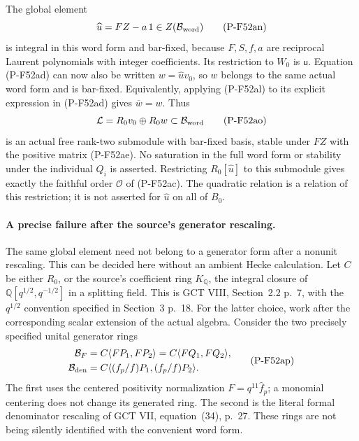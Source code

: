 \documentclass[11pt,a4paper]{article}
\begin{document}
The global element
\[
         \widehat u=FZ-a\,1\in Z(\mathcal B_{\rm word})
                                                               \tag{P-F52an}
\]
is integral in this word form and bar-fixed, because
$F,S,f,a$ are reciprocal Laurent polynomials with integer
coefficients. Its restriction to $W_0$ is $\mathsf u$.
Equation (P-F52ad) can now also be written $w=\widehat u v_0$,
so $w$ belongs to the same actual word form and is bar-fixed.
Equivalently, applying (P-F52al) to its explicit expression
in (P-F52ad) gives $\overline w=w$.
Thus
\[
          \mathcal L=R_0v_0\oplus R_0w
                     \subset\mathcal B_{\rm word}
                                                               \tag{P-F52ao}
\]
is an actual free rank-two submodule with bar-fixed basis,
stable under $FZ$ with the positive matrix (P-F52ae).
No saturation in the full word form or stability under the
individual $Q_i$ is asserted. Restricting
$R_0[\widehat u]$ to this submodule gives exactly the
faithful order $\mathcal O$ of (P-F52ac).
The quadratic relation is a relation of this restriction;
it is not asserted for $\widehat u$ on all of $B_0$.

\paragraph{A precise failure after the source's generator rescaling.}
The same global element need not belong to a generator form
after a nonunit rescaling. This can be decided here without
an ambient Hecke calculation. Let $C$ be either $R_0$, or
the source's coefficient ring $K_{\mathbb Q}$, the integral
closure of $\mathbb Q[q^{1/2},q^{-1/2}]$ in a splitting
field. This is GCT VIII, Section~2.2 p.~7, with the
$q^{1/2}$ convention specified in Section~3 p.~18.
For the latter choice, work after the corresponding scalar
extension of the actual algebra.
Consider the two precisely specified unital generator rings
\[
 \begin{split}
 \mathcal B_F&=C\langle FP_1,FP_2\rangle
              =C\langle FQ_1,FQ_2\rangle,\\
 \mathcal B_{\rm den}
      &=C\langle (f_p/f)P_1,(f_p/f)P_2\rangle.
 \end{split}                                                    \tag{P-F52ap}
\]
The first uses the centered positivity normalization
$F=q^{11}\widehat f_p$; a monomial centering does not
change its generated ring. The second is the literal
formal denominator rescaling of GCT VII, equation~(34),
p.~27. These rings are not being silently identified with
the convenient word form.
\end{document}
